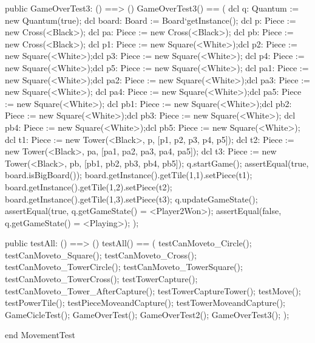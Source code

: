 \begin{vdmpp}[breaklines=true]
    public GameOverTest3: () ==> ()
  GameOverTest3() == (
  dcl q: Quantum := new Quantum(true);
  dcl board: Board := Board`getInstance();
  dcl p: Piece := new Cross(<Black>);
  dcl pa: Piece := new Cross(<Black>);
  dcl pb: Piece := new Cross(<Black>);
  dcl p1: Piece := new Square(<White>);dcl p2: Piece := new Square(<White>);dcl p3: Piece := new Square(<White>);
  dcl p4: Piece := new Square(<White>);dcl p5: Piece := new Square(<White>);
  dcl pa1: Piece := new Square(<White>);dcl pa2: Piece := new Square(<White>);dcl pa3: Piece := new Square(<White>);
  dcl pa4: Piece := new Square(<White>);dcl pa5: Piece := new Square(<White>);
  dcl pb1: Piece := new Square(<White>);dcl pb2: Piece := new Square(<White>);dcl pb3: Piece := new Square(<White>);
  dcl pb4: Piece := new Square(<White>);dcl pb5: Piece := new Square(<White>);
  dcl t1: Piece := new Tower(<Black>, p, [p1, p2, p3, p4, p5]);
  dcl t2: Piece := new Tower(<Black>, pa, [pa1, pa2, pa3, pa4, pa5]);
  dcl t3: Piece := new Tower(<Black>, pb, [pb1, pb2, pb3, pb4, pb5]);
  q.startGame();
  assertEqual(true, board.isBigBoard());
  board.getInstance().getTile(1,1).setPiece(t1);
  board.getInstance().getTile(1,2).setPiece(t2);
  board.getInstance().getTile(1,3).setPiece(t3);
  q.updateGameState();
  assertEqual(true, q.getGameState() = <Player2Won>);
  assertEqual(false, q.getGameState() = <Playing>);
 );
 
  public testAll: () ==> ()
  testAll() == (
    testCanMoveto_Circle();
    testCanMoveto_Square();
   testCanMoveto_Cross();
    testCanMoveto_TowerCircle();
    testCanMoveto_TowerSquare();
    testCanMoveto_TowerCross();
   testTowerCapture();
   testCanMoveto_Tower_AfterCapture();
   testTowerCaptureTower();
   testMove();
   testPowerTile();  
   testPieceMoveandCapture(); 
   testTowerMoveandCapture();
   GameCicleTest();
   GameOverTest();
   GameOverTest2();
   GameOverTest3();
  );
  
end MovementTest
\end{vdmpp}
